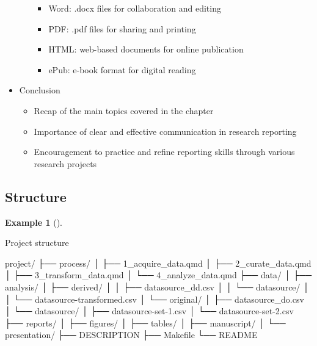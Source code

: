 \documentclass[
  letterpaper,
  DIV=11,
  numbers=noendperiod]{scrreprt}
\newenvironment{Shaded}{\begin{snugshade}}{\end{snugshade}}
\newcommand{\ExtensionTok}[1]{\textcolor[rgb]{0.00,0.00,0.00}{#1}}
\newcommand{\NormalTok}[1]{\textcolor[rgb]{0.00,0.00,0.00}{#1}}
\providecommand{\tightlist}{%
  \setlength{\itemsep}{0pt}\setlength{\parskip}{0pt}}\usepackage{longtable,booktabs,array}
\theoremstyle{definition}
\newtheorem{example}{Example}[chapter]
\theoremstyle{remark}
\begin{document}
\begin{itemize}
\begin{itemize}
    \begin{itemize}
    \tightlist
    \item
      Word: .docx files for collaboration and editing
    \item
      PDF: .pdf files for sharing and printing
    \item
      HTML: web-based documents for online publication
    \item
      ePub: e-book format for digital reading
    \end{itemize}
  \end{itemize}
\item
  Conclusion

  \begin{itemize}
  \tightlist
  \item
    Recap of the main topics covered in the chapter
  \item
    Importance of clear and effective communication in research
    reporting
  \item
    Encouragement to practice and refine reporting skills through
    various research projects
  \end{itemize}
\end{itemize}

\subsection{Structure}\label{structure}

\begin{example}[]\protect\hypertarget{exm-c-structure}{}\label{exm-c-structure}

Project structure

\begin{Shaded}
\begin{Highlighting}[]
\ExtensionTok{project/}
\ExtensionTok{├──}\NormalTok{ process/}
\ExtensionTok{│}\NormalTok{   ├── 1\_acquire\_data.qmd}
\ExtensionTok{│}\NormalTok{   ├── 2\_curate\_data.qmd}
\ExtensionTok{│}\NormalTok{   ├── 3\_transform\_data.qmd}
\ExtensionTok{│}\NormalTok{   └── 4\_analyze\_data.qmd}
\ExtensionTok{├──}\NormalTok{ data/}
\ExtensionTok{│}\NormalTok{   ├── analysis/}
\ExtensionTok{│}\NormalTok{   ├── derived/}
\ExtensionTok{│}\NormalTok{   │   ├── datasource\_dd.csv}
\ExtensionTok{│}\NormalTok{   │   └── datasource/}
\ExtensionTok{│}\NormalTok{   │       └── datasource{-}transformed.csv}
\ExtensionTok{│}\NormalTok{   └── original/}
\ExtensionTok{│}\NormalTok{       ├── datasource\_do.csv}
\ExtensionTok{│}\NormalTok{       └── datasource/}
\ExtensionTok{│}\NormalTok{           ├── datasource{-}set{-}1.csv}
\ExtensionTok{│}\NormalTok{           └── datasource{-}set{-}2.csv}
\ExtensionTok{├──}\NormalTok{ reports/}
\ExtensionTok{│}\NormalTok{   ├── figures/}
\ExtensionTok{│}\NormalTok{   ├── tables/}
\ExtensionTok{│}\NormalTok{   ├── manuscript/}
\ExtensionTok{│}\NormalTok{   └── presentation/}
\ExtensionTok{├──}\NormalTok{ DESCRIPTION}
\ExtensionTok{├──}\NormalTok{ Makefile}
\ExtensionTok{└──}\NormalTok{ README}
\end{Highlighting}
\end{Shaded}

\end{example}
\end{document}
